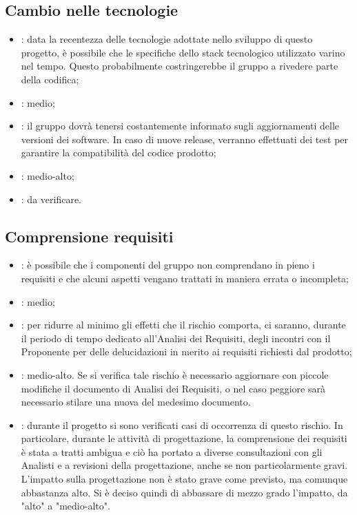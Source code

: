 \subsection{Cambio nelle tecnologie}
\begin{itemize}
\item {}: data la recentezza delle tecnologie adottate nello sviluppo di questo progetto, è possibile che le specifiche dello stack tecnologico utilizzato varino nel tempo. Questo probabilmente costringerebbe il gruppo a rivedere parte della codifica;
\item {}: medio;
\item {}: il gruppo dovrà tenersi costantemente informato sugli aggiornamenti delle versioni dei software. In caso di nuove release, verranno effettuati dei test per garantire la compatibilità del codice prodotto;
\item {}: medio-alto;
\item {}: da verificare.
\end{itemize}

\subsection{Comprensione requisiti}
\begin{itemize}
\item {}: è possibile che i componenti del gruppo non comprendano in pieno i requisiti e che alcuni aspetti vengano trattati in maniera errata o incompleta;
\item {}: medio;
\item {}: per ridurre al minimo gli effetti che il rischio comporta, ci saranno, durante il periodo di tempo dedicato all'Analisi dei Requisiti, degli incontri con il Proponente per delle delucidazioni in merito ai requisiti richiesti dal prodotto;
\item {}: medio-alto. Se si verifica tale rischio è necessario aggiornare con piccole modifiche il documento di Analisi dei Requisiti, o nel caso peggiore sarà necessario stilare una nuova  del medesimo documento.
\item {}: durante il progetto si sono verificati casi di occorrenza di questo rischio. In particolare, durante le attività di progettazione, la comprensione dei requisiti è stata a tratti ambigua e ciò ha portato a diverse consultazioni con gli Analisti e a revisioni della progettazione, anche se non particolarmente gravi. L'impatto sulla progettazione non è stato grave come previsto, ma comunque abbastanza alto. Si è deciso quindi di abbassare di mezzo grado l'impatto, da "alto" a "medio-alto".
\end{itemize}

